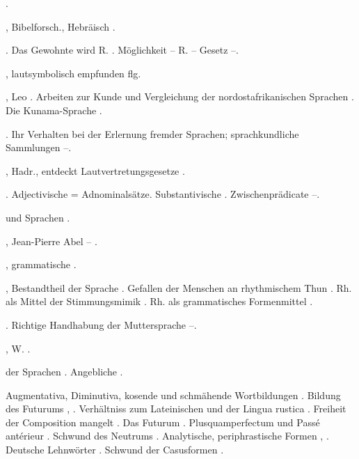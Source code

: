 \begin{register}
 \pageref{sp.309}.

, Bibelforsch., Hebräisch \pageref{sp.25}.

. Das Gewohnte wird R. \pageref{sp.382}. Möglichkeit – R. – Gesetz \pageref{sp.385}–\pageref{sp.387}.

, lautsymbolisch empfunden \pageref{sp.220} flg.


, Leo \pageref{sp.69}. Arbeiten zur Kunde und Vergleichung der nordostafrikanischen Sprachen \pageref{sp.162}. Die Kunama-Sprache \pageref{sp.379}.

. Ihr Verhalten bei der Erlernung fremder Sprachen; sprachkundliche Sammlungen \pageref{sp.68}–\pageref{sp.69}.

, Hadr., entdeckt Lautvertretungsgesetze \pageref{sp.26}.

. Adjectivische = Adnominalsätze. Substantivische \pageref{sp.104}. Zwischenprädicate \pageref{sp.457}–\pageref{sp.459}.

 und Sprachen \pageref{sp.17}.

, Jean-Pierre Abel – \pageref{sp.81}.

, grammatische \pageref{sp.109}.


, Bestandtheil der Sprache \pageref{sp.34}.  Gefallen der Menschen an rhythmischem Thun \pageref{sp.226}. Rh. als Mittel der Stimmungsmimik \pageref{sp.380}. Rh. als grammatisches Formenmittel \pageref{sp.461}.

. Richtige Handhabung der Muttersprache \pageref{sp.61}–\pageref{sp.63}.


, W. \pageref{sp.193}.


 der Sprachen \pageref{sp.381}. Angebliche \pageref{sp.396}.

 Augmentativa, Diminutiva, kosende und schmähende Wortbildungen \pageref{sp.95}. Bildung des Futurums \pageref{sp.159}, \pageref{sp.348}. Verhältniss zum Lateinischen und der Lingua rustica \pageref{sp.183}. Freiheit der Composition mangelt \pageref{sp.236}. Das Futurum \pageref{sp.241}. Plusquamperfectum und Passé antérieur \pageref{sp.253}. Schwund des Neutrums \pageref{sp.254}. Analytische, periphrastische Formen \pageref{sp.257}, \pageref{sp.349}. Deutsche Lehnwörter \pageref{sp.264}.   Schwund der Casusformen \pageref{sp.354}.


\end{register}
